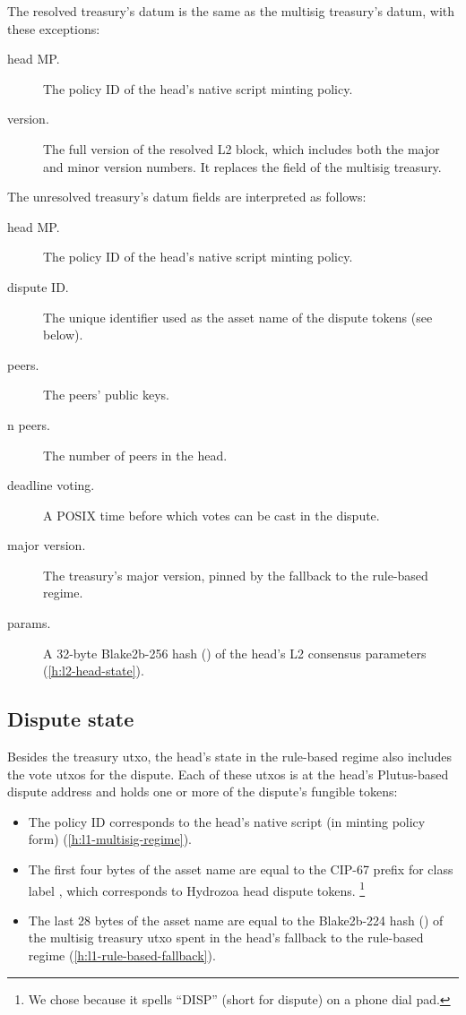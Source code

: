\documentclass[../hydrozoa.tex]{subfiles}
\begin{document}
The resolved treasury's datum is the same as the multisig treasury's datum, with these exceptions:
\begin{description}
  \item[head MP.] The policy ID of the head's native script minting policy.
  \item[version.] The full version of the resolved L2 block, which includes both the major and minor version numbers.
  It replaces the  field of the multisig treasury.
\end{description}

The unresolved treasury's datum fields are interpreted as follows:
\begin{description}
  \item[head MP.] The policy ID of the head's native script minting policy.
  \item[dispute ID.] The unique identifier used as the asset name of the dispute tokens (see below).
  \item[peers.] The peers' public keys.
  \item[n peers.] The number of peers in the head.
  \item[deadline voting.] A POSIX time before which votes can be cast in the dispute.
  \item[major version.] The treasury's major version, pinned by the fallback to the rule-based regime.
  \item[params.] A 32-byte Blake2b-256 hash () of the head's L2 consensus parameters (\cref{h:l2-head-state}).
\end{description}

\subsection{Dispute state}%
\label{h:l1-rule-based-dispute-state}%

Besides the treasury utxo, the head's state in the rule-based regime also includes the vote utxos for the dispute.
Each of these utxos is at the head's Plutus-based dispute address and holds one or more of the dispute's fungible tokens:
\begin{itemize}
  \item The policy ID corresponds to the head's native script (in minting policy form) (\cref{h:l1-multisig-regime}).
  \item The first four bytes of the asset name are equal to the CIP-67
    \citep{AlessandroKonradThomasVellekoopCIP67AssetName2022}
    prefix for class label \headDisputeToken{}, which corresponds to Hydrozoa head dispute tokens.%
    \footnote{We chose \headDisputeToken{} because it spells ``DISP'' (short for dispute) on a phone dial pad.}
  \item The last 28 bytes of the asset name are equal to the Blake2b-224 hash () of the multisig treasury utxo spent in the head's fallback to the rule-based regime (\cref{h:l1-rule-based-fallback}).
\end{itemize}
\end{document}

